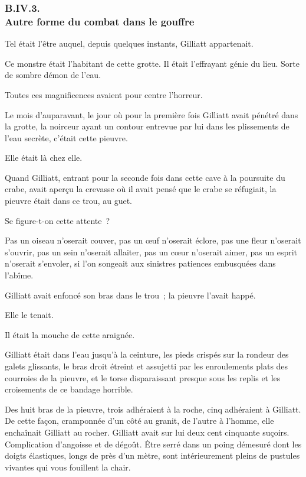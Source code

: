 \documentclass[french,twoside]{book} %
\begin{document}
 \subsubsection[{B.IV.3. Autre forme du combat dans le gouffre}]{B.IV.3. \\
Autre forme du combat dans le gouffre}
\noindent Tel était l’être auquel, depuis quelques instants, Gilliatt appartenait.\par
Ce monstre était l’habitant de cette grotte. Il était l’effrayant génie du lieu. Sorte de sombre démon de l’eau.\par
Toutes ces magnificences avaient pour centre l’horreur.\par
Le mois d’auparavant, le jour où pour la première fois Gilliatt avait pénétré dans la grotte, la noirceur ayant un contour entrevue par lui dans les plissements de l’eau secrète, c’était cette pieuvre.\par
Elle était là chez elle.\par
Quand Gilliatt, entrant pour la seconde fois dans cette cave à la poursuite du crabe, avait aperçu la crevasse où il avait pensé que le crabe se réfugiait, la pieuvre était dans ce trou, au guet.\par
Se figure-t-on cette attente ?\par
 Pas un oiseau n’oserait couver, pas un œuf n’oserait éclore, pas une fleur n’oserait s’ouvrir, pas un sein n’oserait allaiter, pas un cœur n’oserait aimer, pas un esprit n’oserait s’envoler, si l’on songeait aux sinistres patiences embusquées dans l’abîme.\par
Gilliatt avait enfoncé son bras dans le trou ; la pieuvre l’avait happé.\par
Elle le tenait.\par
Il était la mouche de cette araignée.\par
Gilliatt était dans l’eau jusqu’à la ceinture, les pieds crispés sur la rondeur des galets glissants, le bras droit étreint et assujetti par les enroulements plats des courroies de la pieuvre, et le torse disparaissant presque sous les replis et les croisements de ce bandage horrible.\par
Des huit bras de la pieuvre, trois adhéraient à la roche, cinq adhéraient à Gilliatt. De cette façon, cramponnée d’un côté au granit, de l’autre à l’homme, elle enchaînait Gilliatt au rocher. Gilliatt avait sur lui deux cent cinquante suçoirs. Complication d’angoisse et de dégoût. Être serré dans un poing démesuré dont les doigts élastiques, longs de près d’un mètre, sont intérieurement pleins de pustules vivantes qui vous fouillent la chair.\par
\end{document}
